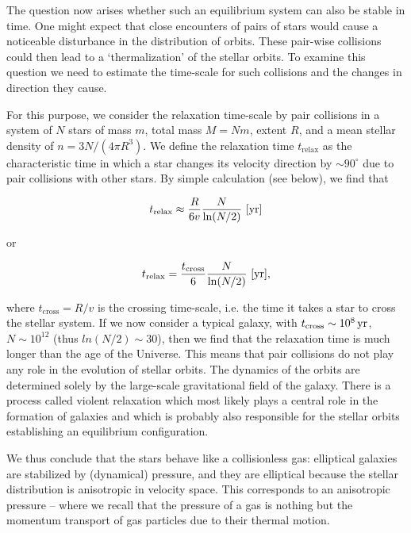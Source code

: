 \documentclass[a4paper,10pt]{article}
\begin{document}
{\noindent}The question now arises whether such an equilibrium system can also be stable in time. One might expect that close encounters of pairs of stars would cause a noticeable disturbance in the distribution of orbits. These pair-wise collisions could then lead to a `thermalization' of the stellar orbits. To examine this question we need to estimate the time-scale for such collisions and the changes in direction they cause.

{\noindent}For this purpose, we consider the relaxation time-scale by pair collisions in a system of $N$ stars of mass $m$, total mass $M=Nm$, extent $R$, and a mean stellar density of $n=3N/(4\pi R^3)$. We define the relaxation time $t_\mathrm{relax}$ as the characteristic time in which a star changes its velocity direction by $\sim90^\circ$ due to pair collisions with other stars. By simple calculation (see below), we find that

\begin{align*}
    t_\mathrm{relax} \approx \frac{R}{6v} \frac{N}{\ln(N/2)} ~ [{\rm yr}]
\end{align*}

{\noindent}or

\begin{align*}
    t_\mathrm{relax} = \frac{t_\mathrm{cross}}{6} \frac{N}{\ln(N/2)} ~ [{\rm yr}],
\end{align*}

{\noindent}where $t_\mathrm{cross}=R/v$ is the crossing time-scale, i.e. the time it takes a star to cross the stellar system. If we now consider a typical galaxy, with $t_\mathrm{cross}\sim10^8\,{\rm yr}$, $N\sim10^{12}$ (thus $ln(N/2)\sim30$), then we find that the relaxation time is much longer than the age of the Universe. This means that pair collisions do not play any role in the evolution of stellar orbits. The dynamics of the orbits are determined solely by the large-scale gravitational field of the galaxy. There is a process called violent relaxation which most likely plays a central role in the formation of galaxies and which is probably also responsible for the stellar orbits establishing an equilibrium configuration.

{\noindent}We thus conclude that the stars behave like a collisionless gas: elliptical galaxies are stabilized by (dynamical) pressure, and they are elliptical because the stellar distribution is anisotropic in velocity space. This corresponds to an anisotropic pressure -- where we recall that the pressure of a gas is nothing but the momentum transport of gas particles due to their thermal motion.
\end{document}
